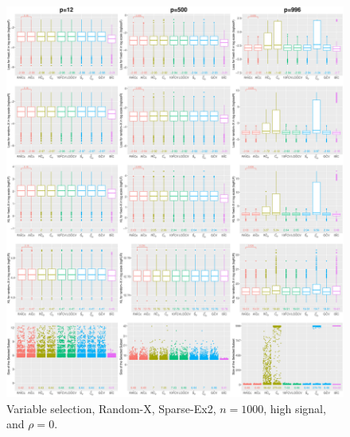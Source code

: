 \begin{figure}[!ht]
\centering
\includegraphics[width=\textwidth]{figures/supplement/randomx/subset_selection/Sparse-Ex2_n1000_hsnr_rho0.eps}
\caption{Variable selection, Random-X, Sparse-Ex2, $n=1000$, high signal, and $\rho=0$.}
\end{figure}
\clearpage
